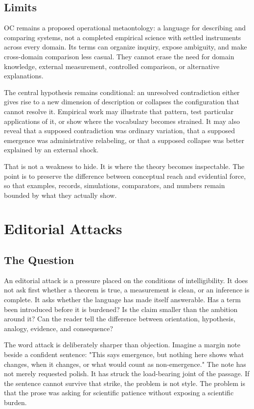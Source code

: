 \documentclass[11pt,a4paper,openany]{book}
\begin{document}
\subsection{Limits}
OC remains a proposed operational metaontology: a language for describing and comparing systems, not a completed empirical science with settled instruments across every domain. Its terms can organize inquiry, expose ambiguity, and make cross-domain comparison less casual. They cannot erase the need for domain knowledge, external measurement, controlled comparison, or alternative explanations. \cite{wilson_renormalization,landau_stat_physics}\par
The central hypothesis remains conditional: an unresolved contradiction either gives rise to a new dimension of description or collapses the configuration that cannot resolve it. Empirical work may illustrate that pattern, test particular applications of it, or show where the vocabulary becomes strained. It may also reveal that a supposed contradiction was ordinary variation, that a supposed emergence was administrative relabeling, or that a supposed collapse was better explained by an external shock.\par
That is not a weakness to hide. It is where the theory becomes inspectable. The point is to preserve the difference between conceptual reach and evidential force, so that examples, records, simulations, comparators, and numbers remain bounded by what they actually show.\par
\section{Editorial Attacks}
\subsection{The Question}
An editorial attack is a pressure placed on the conditions of intelligibility. It does not ask first whether a theorem is true, a measurement is clean, or an inference is complete. It asks whether the language has made itself answerable. Has a term been introduced before it is burdened? Is the claim smaller than the ambition around it? Can the reader tell the difference between orientation, hypothesis, analogy, evidence, and consequence? \cite{landau_stat_physics,prigogine_dissipative}\par
The word attack is deliberately sharper than objection. Imagine a margin note beside a confident sentence: "This says emergence, but nothing here shows what changes, when it changes, or what would count as non-emergence." The note has not merely requested polish. It has struck the load-bearing joint of the passage. If the sentence cannot survive that strike, the problem is not style. The problem is that the prose was asking for scientific patience without exposing a scientific burden.\par
\end{document}
